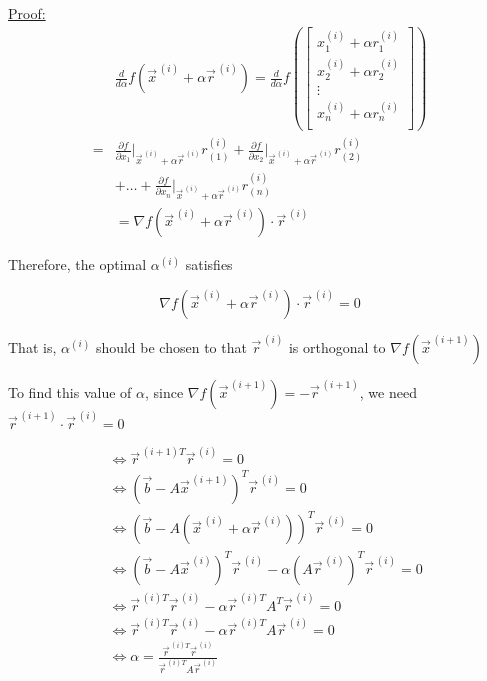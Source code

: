 \underline{Proof:}
\begin{align*}
    &\frac{d}{d\alpha}f\left(\vec{x}^{\,(i)} + \alpha\vec{r}^{\,(i)}\right) =
    \frac{d}{d\alpha}f\left(
    \begin{bmatrix}
        x^{(i)}_1 + \alpha r^{(i)}_1 \\
        x^{(i)}_2 + \alpha r^{(i)}_2 \\
        \vdots \\
        x^{(i)}_n + \alpha r^{(i)}_n \\
    \end{bmatrix}
    \right)\\
    = &\frac{\partial f}{\partial x_1}\bigg\rvert_{\vec{x}^{\,(i)} + \alpha\vec{r}^{\,(i)}} r_{(1)}^{(i)}
    + \frac{\partial f}{\partial x_2}\bigg\rvert_{\vec{x}^{\,(i)} + \alpha\vec{r}^{\,(i)}} r_{(2)}^{(i)}\\
    & + \ldots + \frac{\partial f}{\partial x_n}\bigg\rvert_{\vec{x}^{\,(i)} + \alpha\vec{r}^{\,(i)}} r_{(n)}^{(i)}\\
    &= \nabla f\left(\vec{x}^{\,(i)} + \alpha\vec{r}^{\,(i)}\right)\cdot \vec{r}^{\,(i)}
\end{align*}


Therefore, the optimal $\alpha^{(i)}$ satisfies

\begin{equation*}
    \nabla f\left(\vec{x}^{\,(i)} + \alpha \vec{r}^{\,(i)}\right)\cdot \vec{r}^{\,(i)} = 0
\end{equation*}

That is, $\alpha^{(i)}$ should be chosen to that $\vec{r}^{\,(i)}$ is orthogonal to $\nabla f\left(\vec{x}^{\,(i+1)}\right)$

\begin{center}
    
\end{center}

To find this value of $\alpha$, since $\nabla f\left(\vec{x}^{\,(i+1)}\right)=-\vec{r}^{\,(i+1)}$, we need $\vec{r}^{\,(i+1)} \cdot \vec{r}^{\,(i)}=0$

\begin{align*}
    &\Leftrightarrow \vec{r}^{\,(i+1)T}  \vec{r}^{\,(i)}=0\\
    &\Leftrightarrow \left(\vec{b} - A\vec{x}^{\,(i+1)}\right)^T \vec{r}^{\,(i)}=0\\
    &\Leftrightarrow \left(\vec{b} - A\left(\vec{x}^{\,(i)} + \alpha \vec{r}^{\,(i)}\right)\right)^T \vec{r}^{\,(i)}=0\\
    &\Leftrightarrow
    \left(\vec{b} - A\vec{x}^{\,(i)}\right)^T
    \vec{r}^{\,(i)}
    - \alpha \left( A\vec{r}^{\,(i)}\right)^T
    \vec{r}^{\,(i)}
    =0\\
    &\Leftrightarrow
    \vec{r}^{\,(i)T}
    \vec{r}^{\,(i)}
    - \alpha \vec{r}^{\,(i)T} A^T
    \vec{r}^{\,(i)}
    = 0 \\
    &\Leftrightarrow
    \vec{r}^{\,(i)T}
    \vec{r}^{\,(i)}
    - \alpha \vec{r}^{\,(i)T} A
    \vec{r}^{\,(i)}
    = 0 \\
    &\Leftrightarrow \alpha = \frac{\vec{r}^{\,(i)T}\vec{r}^{\,(i)}}{\vec{r}^{\,(i)T}A\vec{r}^{\,(i)}}
\end{align*}



